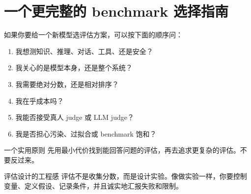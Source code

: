 \section{一个更完整的 benchmark 选择指南}

如果你要给一个新模型选评估方案，可以按下面的顺序问：
\begin{enumerate}
    \item 我想测知识、推理、对话、工具、还是安全？
    \item 我关心的是模型本身，还是整个系统？
    \item 我需要绝对分数，还是相对排序？
    \item 我在乎成本吗？
    \item 我能否接受真人 judge 或 LLM judge？
    \item 我是否担心污染、过拟合或 benchmark 饱和？
\end{enumerate}

\begin{importantbox}{一个实用原则}
先用最小代价找到能回答问题的评估，再去追求更复杂的评估。不要反过来。
\end{importantbox}

\begin{knowledgebox}{评估设计的工程感}
评估不是收集分数，而是设计实验。像做实验一样，你要控制变量、定义假设、记录条件，并且诚实地汇报失败和限制。
\end{knowledgebox}

